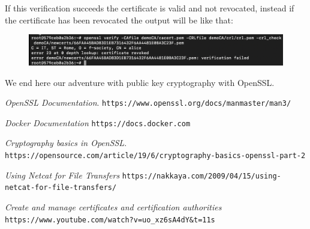 \documentclass[11pt]{article}
\begin{document}
If this verification succeeds the certificate is valid and not revocated, instead if the certificate has been revocated the output will be like that:\newline

\begin{figure}[!ht]
 \includegraphics[width=1\textwidth]{pic7-hw6-7-1635747}
 \label{fig:crl result}
\end{figure}
We end here our adventure with public key cryptography with OpenSSL.


\vfill
\begin{thebibliography}{99}

{\em OpenSSL Documentation}. \newline
\verb|https://www.openssl.org/docs/manmaster/man3/|

{\em Docker Documentation} \newline
\verb|https://docs.docker.com|

{\em Cryptography basics in OpenSSL}. \newline
\verb|https://opensource.com/article/19/6/cryptography-basics-openssl-part-2|

{\em Using Netcat for File Transfers} \newline
\verb|https://nakkaya.com/2009/04/15/using-netcat-for-file-transfers/|

{\em Create and manage certificates and certification authorities} \newline
\verb|https://www.youtube.com/watch?v=uo_xz6sA4dY&t=11s|

\end{thebibliography}
\end{document}
